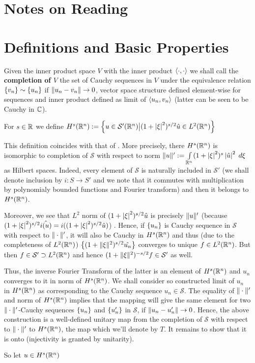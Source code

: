 \documentclass[10pt]{article} %
\renewcommand{\S}{\mathcal{S}}
\begin{document}
\section{Notes on Reading \cite{gilkey}}
\section{Definitions and Basic Properties}
\begin{mydef}Given the inner product space $V$ with the inner product $\left< \cdot,\cdot \right>$ we
	shall call the {\bf completion of $V$} the set of Cauchy sequences in $V$ under the equivalence relation
	$\left\{ v_n \right\}\sim\left\{ u_n \right\}$ if $\| u_n-v_n \|\to0$, vector space structure defined element-wise for sequences
	and inner product defined as limit of $\left< u_n,v_n \right>$ (latter can be seen to be Cauchy in $\mathbb{C}$).
\end{mydef}
\begin{mydef}For $s\in\mathbb{R}$ we define $H^s(\mathbb{R}^n):=\left\{u\in\mathcal{S}'(\mathbb{R}^n)\big| (1+\left|\xi\right|^2)^{s/2}\hat{u}\in L^2(\mathbb{R}^n)\right\}$
	\end{mydef}
\begin{myremark}This definition coincides with that of \cite{gilkey}. More precisely, there $H^s(\mathbb{R}^n)$ is
isomorphic to completion of $\mathcal{S}$ with respect to norm $\mynorm{u}':=\int_{\R^n}(1+\myabs{\xi}^2)^{s}\myabs{\hat{u}}^2\;d\xi
$ as Hilbert spaces. Indeed, every element of $\S$ is naturally included in $\S'$ (we shall denote inclusion by $i:S\rightarrow S'$
and we note that it commutes with multiplication by polynomialy bounded functions and Fourier transform) 
and then it belongs to $H^s(\mathbb{R}^n)$.

Moreover, we see that $L^2$ norm of $(1+\left| \xi \right|^2)^{ s/2 }\hat{ u }$ is precisely
$\| u \|'$ (because $(1+\left| \xi \right|^2)^{ s/2 }\hat{i(u)}=i((1+\left| \xi \right|^2)^{ s/2 }\hat{ u })$)
. Hence, if $\left\{ u_n \right\}$ is Cauchy sequence in $\S$ with respect to $\| \cdot \|'$, it will
also be Cauchy in $H^s(\mathbb{R}^n)$ and thus (due to the completeness of $L^2(\mathbb{R}^n)$)
$\left\{ (1+\| \xi \|^2)^{ s/2 }\hat{ u_n } \right\}$ converges to unique
$f\in L^2(\mathbb{R}^n)$. But then $f\in\S'\supset L^2(\R^n)$ and hence $(1+\mynorm{ \xi }^2)^{ -s/2 }f\in\S'$ as well. 

Thus, the inverse Fourier Transform of the latter is an element of $H^s(\mathbb{R}^n)$ and $u_n$ converges to it in norm of $H^s(\mathbb{R}^n)$.
We shall consider so constructed limit of $u_n$ in $H^s(\mathbb{R}^n)$ as corresponding to the Cauchy sequence $u_n\in\S$.
The equality of $\| \cdot \|'$ and norm of $H^s(\mathbb{R}^n)$
implies that the mapping will give the same element for two $\| \cdot \|'$-Cauchy
sequences $\left\{ u_n \right\}$ and $\left\{ u_n' \right\}$ in $\S$, if $\| u_n-u_n' \|\to0$. Hence, the above construction is
a well-defined unitary map from the completion of $\S$ with respect to $\| \cdot \|'$ to $H^s(\mathbb{R}^n)$, the map which we'll
denote by $T$. It remains to show that it is onto (injectivity is granted by unitarity).

So let $u\in H^s(\mathbb{R}^n)$
\end{myremark}
\end{document}
